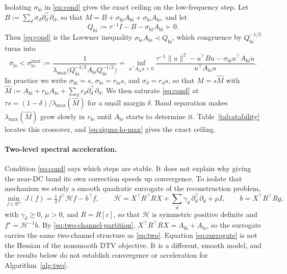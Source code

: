 \documentclass{article}
\newcommand{\R}{\mathbb{R}}
\begin{document}
Isolating $\sigma_{\mathrm{lo}}$ in \eqref{eq:cond} gives the exact ceiling on the low-frequency step. Let $B:=\sum_d\sigma_d\partial_d^\top\partial_d$, so that $M=B+\sigma_{\mathrm{hi}}A_{\mathrm{hi}}+\sigma_{\mathrm{lo}}A_{\mathrm{lo}}$, and let
\begin{equation}
\label{eq:Qhi}
Q_{\mathrm{hi}}:=\tau^{-1}I-B-\sigma_{\mathrm{hi}}A_{\mathrm{hi}}\succ0 .
\end{equation}
Then \eqref{eq:cond} is the Loewner inequality $\sigma_{\mathrm{lo}}A_{\mathrm{lo}}\prec Q_{\mathrm{hi}}$, which congruence by $Q_{\mathrm{hi}}^{-1/2}$ turns into
\begin{equation}
\label{eq:sigma-lo-max}
\sigma_{\mathrm{lo}}<\sigma_{\mathrm{lo}}^{\max}
:=\frac{1}{\lambda_{\max}\big(Q_{\mathrm{hi}}^{-1/2}A_{\mathrm{lo}}Q_{\mathrm{hi}}^{-1/2}\big)}
=\inf_{u^\top A_{\mathrm{lo}}u>0}\frac{\tau^{-1}\|u\|^2-u^\top Bu-\sigma_{\mathrm{hi}}u^\top A_{\mathrm{hi}}u}{u^\top A_{\mathrm{lo}}u}.
\end{equation}
In practice we write $\sigma_{\mathrm{hi}}=s$, $\sigma_{\mathrm{lo}}=r_{\mathrm{lo}}s$, and $\sigma_d=r_ds$, so that $M=s\widehat M$ with $\widehat M:=A_{\mathrm{hi}}+r_{\mathrm{lo}}A_{\mathrm{lo}}+\sum_dr_d\partial_d^\top\partial_d$. We then saturate \eqref{eq:cond} at $\tau s=(1-\delta)/\lambda_{\max}(\widehat M)$ for a small margin $\delta$. Band separation makes $\lambda_{\max}(\widehat M)$ grow slowly in $r_{\mathrm{lo}}$ until $A_{\mathrm{lo}}$ starts to determine it. Table~\ref{tab:stability} locates this crossover, and \eqref{eq:sigma-lo-max} gives the exact ceiling.

\paragraph{Two-level spectral acceleration.}
Condition \eqref{eq:cond} says which steps are stable. It does not explain why giving the near-DC band its own correction speeds up convergence. To isolate that mechanism we study a smooth quadratic surrogate of the reconstruction problem,
\begin{equation}
\label{eq:surrogate}
\min_{f\in\R^n}\;J(f)=\tfrac12 f^\top\mathcal H f-b^\top f,
\qquad
\mathcal H=X^\top R^\top RX+\sum_d\gamma_d\,\partial_d^\top\partial_d+\mu I,
\qquad
b=X^\top R^\top Rg,
\end{equation}
with $\gamma_d\ge0$, $\mu>0$, and $R=R[c]$, so that $\mathcal H$ is symmetric positive definite and $f^\star=\mathcal H^{-1}b$. By \eqref{eq:two-channel-partition}, $X^\top R^\top RX=A_{\mathrm{hi}}+A_{\mathrm{lo}}$, so the surrogate carries the same two-channel structure as \eqref{eq:two}. Equation \eqref{eq:surrogate} is not the Hessian of the nonsmooth DTV objective. It is a different, smooth model, and the results below do not establish convergence or acceleration for Algorithm~\ref{alg:two}.
\end{document}
